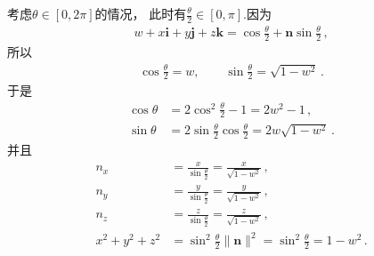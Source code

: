\begin{prove}
    考虑$\theta\in[0,2\pi]$的情况，
    此时有$\displaystyle\frac{\theta}{2}\in[0,\pi]$.因为
    \begin{align}
        w+x\mathbf{i}+y\mathbf{j}+z\mathbf{k}=\cos\frac{\theta}{2}+\bm n\sin\frac{\theta}{2}\, ,
    \end{align}
    所以
    \begin{align}
        \cos\frac{\theta}{2}=w,\qquad\sin\frac{\theta}{2}=\sqrt{1-w^2}\, .
    \end{align}
    于是
    \begin{align}
        \cos\theta & =2\cos^2\frac{\theta}{2}-1=2w^2-1\, ,                         \\
        \sin\theta & =2\sin\frac{\theta}{2}\cos\frac{\theta}{2}=2w\sqrt{1-w^2}\, .
    \end{align}
    并且
    \begin{align}
        n_x         & =\frac{x}{\sin\frac{\theta}{2}}=\frac{x}{\sqrt{1-w^2}}\, ,          \\
        n_y         & =\frac{y}{\sin\frac{\theta}{2}}=\frac{y}{\sqrt{1-w^2}}\, ,          \\
        n_z         & =\frac{z}{\sin\frac{\theta}{2}}=\frac{z}{\sqrt{1-w^2}}\, ,          \\
        x^2+y^2+z^2 & =\sin^2\frac{\theta}{2}\|\bm n\|^2=\sin^2\frac{\theta}{2}=1-w^2\, .
    \end{align}


\end{prove}
